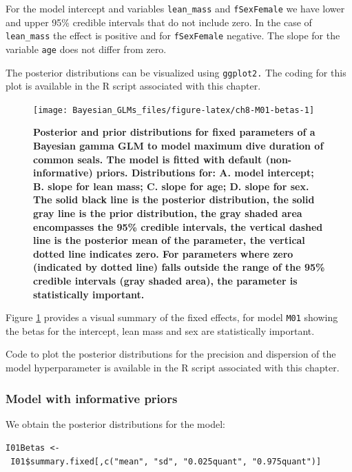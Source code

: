 \documentclass[
]{book}
\begin{document}
For the model intercept and variables \texttt{lean\_mass} and \texttt{fSexFemale} we have lower and upper 95\% credible intervals that do not include zero. In the case of \texttt{lean\_mass} the effect is positive and for \texttt{fSexFemale} negative. The slope for the variable \texttt{age} does not differ from zero.

The posterior distributions can be visualized using \texttt{ggplot2.} The coding for this plot is available in the R script associated with this chapter.



\begin{figure}

{\centering \texttt{[image: Bayesian\_GLMs\_files/figure-latex/ch8-M01-betas-1]} 

}

\caption{\textbf{Posterior and prior distributions for fixed parameters of a Bayesian gamma GLM to model maximum dive duration of common seals. The model is fitted with default (non-informative) priors. Distributions for: A. model intercept; B. slope for lean mass; C. slope for age; D. slope for sex. The solid black line is the posterior distribution, the solid gray line is the prior distribution, the gray shaded area encompasses the 95\% credible intervals, the vertical dashed line is the posterior mean of the parameter, the vertical dotted line indicates zero. For parameters where zero (indicated by dotted line) falls outside the range of the 95\% credible intervals (gray shaded area), the parameter is statistically important.}}\label{fig:ch8-M01-betas}
\end{figure}

Figure \ref{fig:ch8-M01-betas} provides a visual summary of the fixed effects, for model \texttt{M01} showing the betas for the intercept, lean mass and sex are statistically important.

Code to plot the posterior distributions for the precision and dispersion of the model hyperparameter is available in the R script associated with this chapter.

\hypertarget{gamma-inf-priors}{%
\subsubsection{Model with informative priors}\label{gamma-inf-priors}}

We obtain the posterior distributions for the model:

\texttt{I01Betas\ \textless{}-\ I01\$summary.fixed{[},c("mean",\ "sd",\ "0.025quant",\ "0.975quant"){]}}
\end{document}
